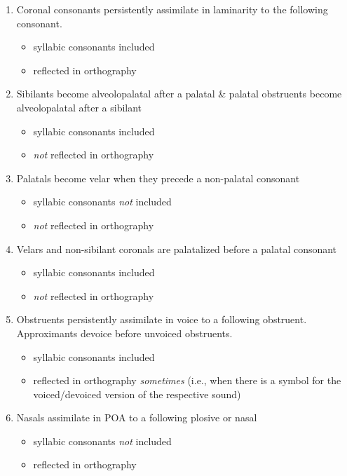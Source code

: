 \documentclass[a4paper,11pt,oneside,openany]{memoir}
\begin{document}
\begin{enumerate}
    \item Coronal consonants persistently assimilate in laminarity to the following consonant.
    \begin{itemize}
        \item syllabic consonants included
        \item reflected in orthography
    \end{itemize}
    \item Sibilants become alveolopalatal after a palatal \& palatal obstruents become alveolopalatal after a sibilant
    \begin{itemize}
        \item syllabic consonants included
        \item \emph{not} reflected in orthography
    \end{itemize}
    \item Palatals become velar when they precede a non-palatal consonant
    \begin{itemize}
        \item syllabic consonants \emph{not} included
        \item \emph{not} reflected in orthography
    \end{itemize}
    \item Velars and non-sibilant coronals are palatalized before a palatal consonant
    \begin{itemize}
        \item syllabic consonants included
        \item \emph{not} reflected in orthography
    \end{itemize}
    \item Obstruents persistently assimilate in voice to a following obstruent. Approximants devoice before unvoiced obstruents.
    \begin{itemize}
        \item syllabic consonants included
        \item reflected in orthography \emph{sometimes} (i.e., when there is a symbol for the voiced/devoiced version of the respective sound)
    \end{itemize}
    \item Nasals assimilate in POA to a following plosive or nasal
    \begin{itemize}
        \item syllabic consonants \emph{not} included
        \item reflected in orthography

\end{itemize}
\end{enumerate}
\end{document}

